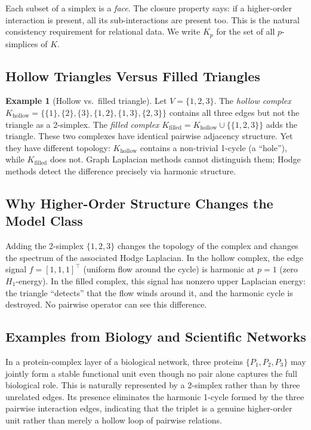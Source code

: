 \documentclass[11pt]{article}
\theoremstyle{definition}
\newtheorem{example}[theorem]{Example}
\theoremstyle{remark}
\begin{document}
Each subset of a simplex is a \emph{face}. The closure property says: if a
higher-order interaction is present, all its sub-interactions are present too.
This is the natural consistency requirement for relational data. We write
$K_p$ for the set of all $p$-simplices of $K$.

\subsection{Hollow Triangles Versus Filled Triangles}

\begin{example}[Hollow vs.\ filled triangle]
\label{ex:hollow}
Let $V=\{1,2,3\}$. The \emph{hollow complex}
$K_{\mathrm{hollow}} = \{\{1\},\{2\},\{3\},\{1,2\},\{1,3\},\{2,3\}\}$ contains
all three edges but not the triangle as a 2-simplex. The \emph{filled complex}
$K_{\mathrm{filled}} = K_{\mathrm{hollow}} \cup \{\{1,2,3\}\}$ adds the triangle.
These two complexes have identical pairwise adjacency structure. Yet they have
different topology: $K_{\mathrm{hollow}}$ contains a non-trivial 1-cycle (a
``hole''), while $K_{\mathrm{filled}}$ does not. Graph Laplacian methods cannot
distinguish them; Hodge methods detect the difference precisely via harmonic
structure.
\end{example}

\subsection{Why Higher-Order Structure Changes the Model Class}

Adding the 2-simplex $\{1,2,3\}$ changes the topology of the complex and
changes the spectrum of the associated Hodge Laplacian. In the hollow complex,
the edge signal $f=[1,1,1]^\top$ (uniform flow around the cycle) is harmonic
at $p=1$ (zero $H_1$-energy). In the filled complex, this signal has nonzero
upper Laplacian energy: the triangle ``detects'' that the flow winds around it,
and the harmonic cycle is destroyed. No pairwise operator can see this
difference.

\subsection{Examples from Biology and Scientific Networks}

In a protein-complex layer of a biological network, three proteins $\{P_1, P_2, P_3\}$ may jointly form a stable functional unit even though no pair alone captures the full biological role. This is naturally represented by a 2-simplex rather than by three unrelated edges. Its presence eliminates the harmonic 1-cycle formed by the three pairwise interaction edges, indicating that the triplet is a genuine higher-order unit rather than merely a hollow loop of pairwise relations.
\end{document}
